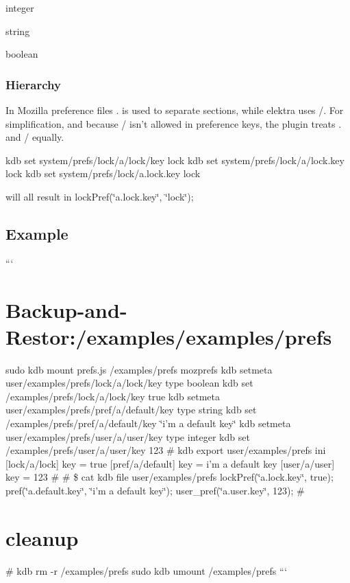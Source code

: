 \begin{DoxyItemize}
\item {\ttfamily integer}
\item {\ttfamily string}
\item {\ttfamily boolean}
\end{DoxyItemize}

\subsubsection*{Hierarchy}

In Mozilla preference files {\ttfamily .} is used to separate sections, while elektra uses {\ttfamily /}. For simplification, and because {\ttfamily /} isn't allowed in preference keys, the plugin treats {\ttfamily .} and {\ttfamily /} equally. \begin{DoxyVerb}kdb set system/prefs/lock/a/lock/key lock
kdb set system/prefs/lock/a/lock.key lock
kdb set system/prefs/lock/a.lock.key lock
\end{DoxyVerb}


will all result in {\ttfamily lock\+Pref(\char`\"{}a.\+lock.\+key\char`\"{}, \char`\"{}lock\char`\"{});}

\subsection*{Example}

``` \section*{Backup-\/and-\/\+Restor\+:/examples/examples/prefs}

sudo kdb mount prefs.\+js /examples/prefs mozprefs kdb setmeta user/examples/prefs/lock/a/lock/key type boolean kdb set /examples/prefs/lock/a/lock/key true kdb setmeta user/examples/prefs/pref/a/default/key type string kdb set /examples/prefs/pref/a/default/key \char`\"{}i'm a default key\char`\"{} kdb setmeta user/examples/prefs/user/a/user/key type integer kdb set /examples/prefs/user/a/user/key 123 \# kdb export user/examples/prefs ini \mbox{[}lock/a/lock\mbox{]} key = true \mbox{[}pref/a/default\mbox{]} key = i'm a default key \mbox{[}user/a/user\mbox{]} key = 123 \# \# \$ cat {\ttfamily kdb file user/examples/prefs} lock\+Pref(\char`\"{}a.\+lock.\+key\char`\"{}, true); pref(\char`\"{}a.\+default.\+key\char`\"{}, \char`\"{}i'm a default key\char`\"{}); user\+\_\+pref(\char`\"{}a.\+user.\+key\char`\"{}, 123); \# \section*{cleanup}

\# kdb rm -\/r /examples/prefs sudo kdb umount /examples/prefs ``` 